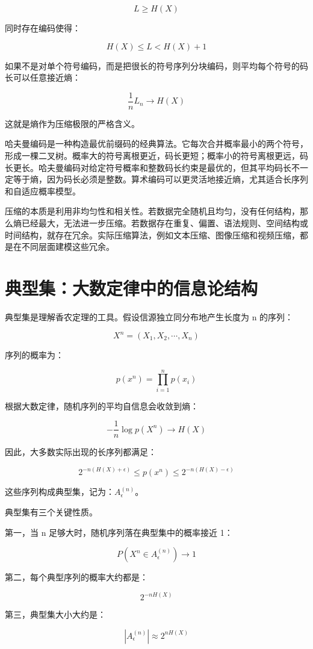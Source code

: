 \[
L\ge H(X)
\]

同时存在编码使得：

\[
H(X)\le L < H(X)+1
\]

如果不是对单个符号编码，而是把很长的符号序列分块编码，则平均每个符号的码长可以任意接近熵：

\[
\frac{1}{n}L_n\to H(X)
\]

这就是熵作为压缩极限的严格含义。

哈夫曼编码是一种构造最优前缀码的经典算法。它每次合并概率最小的两个符号，形成一棵二叉树。概率大的符号离根更近，码长更短；概率小的符号离根更远，码长更长。哈夫曼编码对给定符号概率和整数码长约束是最优的，但其平均码长不一定等于熵，因为码长必须是整数。算术编码可以更灵活地接近熵，尤其适合长序列和自适应概率模型。

压缩的本质是利用非均匀性和相关性。若数据完全随机且均匀，没有任何结构，那么熵已经最大，无法进一步压缩。若数据存在重复、偏置、语法规则、空间结构或时间结构，就存在冗余。实际压缩算法，例如文本压缩、图像压缩和视频压缩，都是在不同层面建模这些冗余。

\section{典型集：大数定律中的信息论结构}

典型集是理解香农定理的工具。假设信源独立同分布地产生长度为 n 的序列：

\[
X^n=(X_1,X_2,\cdots,X_n)
\]

序列的概率为：

\[
p(x^n)=\prod_{i=1}^{n}p(x_i)
\]

根据大数定律，随机序列的平均自信息会收敛到熵：

\[
-\frac{1}{n}\log p(X^n)\to H(X)
\]

因此，大多数实际出现的长序列都满足：

\[
2^{-n(H(X)+\epsilon)}\le p(x^n)\le 2^{-n(H(X)-\epsilon)}
\]

这些序列构成典型集，记为：\( A_{\epsilon}^{(n)}\)。

典型集有三个关键性质。

第一，当 n 足够大时，随机序列落在典型集中的概率接近 1：

\[
P(X^n\in A_{\epsilon}^{(n)})\to 1
\]

第二，每个典型序列的概率大约都是：

\[
2^{-nH(X)}
\]

第三，典型集大小大约是：

\[
|A_{\epsilon}^{(n)}|\approx 2^{nH(X)}
\]

